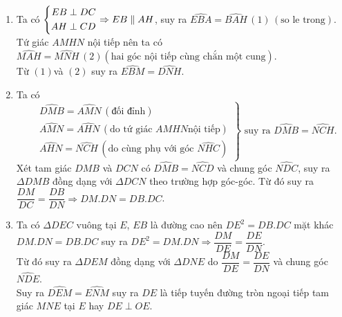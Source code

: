 \begin{ex}
{\begin{enumerate}
        Mà hai góc ở vị trí đối nhau nên $AMHN$ là tứ giác nội tiếp.
        \item Ta có $\left\{\begin{aligned}EB\perp DC\\ AH\perp CD\end{aligned}\right.\Rightarrow EB\parallel AH$, suy ra $\widehat{EBA}=\widehat{BAH}\, (1) \, (\mbox{so le trong}). $\\
        Tứ giác $AMHN$ nội tiếp nên ta có $\widehat{MAH}=\widehat{MNH}\, (2) (\mbox{hai góc nội tiếp cùng chắn một cung})$.\\
        Từ $(1)$và $(2)$ suy ra $\widehat{EBM}=\widehat{DNH}$.
        \item Ta có
        $$
        \left.
        \begin{aligned}
        &\widehat{DMB}=\widehat{AMN}\, (\mbox{đối đỉnh})\\
        &\widehat{AMN}=\widehat{AHN}\, (\mbox{do tứ giác } AMHN \mbox{nội tiếp})\\
        &\widehat{AHN}=\widehat{NCH}\, (\mbox{do cùng phụ với góc } \widehat{NHC})
        \end{aligned} 
        \right\} 
        \mbox{ suy ra } \widehat{DMB}=\widehat{NCH}.
        $$        
        Xét tam giác $DMB$ và $DCN$ có $\widehat{DMB}=\widehat{NCD}$ và chung góc $\widehat{NDC}$, suy ra $\Delta DMB$ đồng dạng với $\Delta DCN$ theo trường hợp góc-góc. Từ đó suy ra $\dfrac{DM}{DC}=\dfrac{DB}{DN}\Rightarrow DM.DN=DB.DC$.
        \item Ta có $\Delta DEC$ vuông tại $E$, $EB$ là đường cao nên $DE^2=DB.DC$ mặt khác $DM.DN=DB.DC$ suy ra $DE^2=DM.DN \Rightarrow \dfrac{DM}{DE}=\dfrac{DE}{DN}$.\\
        Từ đó suy ra $\Delta DEM$ đồng dạng với $\Delta DNE$ do $\dfrac{DM}{DE}=\dfrac{DE}{DN}$ và chung góc $\widehat{NDE}$.\\
        Suy ra $\widehat{DEM}=\widehat{ENM}$ suy ra $DE$ là tiếp tuyến đường tròn ngoại tiếp tam giác $MNE$ tại $E$ hay $DE\perp OE$. 
    \end{enumerate}
    }
\end{ex}

